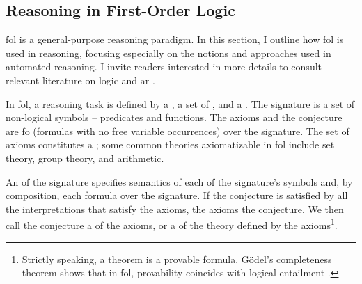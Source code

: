 \subsection{Reasoning in First-Order Logic}


\Gls{fol} is a general-purpose reasoning paradigm.
In this section, I outline how \gls{fol} is used in reasoning,
focusing especially on the notions and approaches used in automated reasoning.
I invite readers interested in more details to consult relevant literature on \gls{logic} \cite{DBLP:books/daglib/0072413,DBLP:books/daglib/0082098} and \gls{ar} \cite{DBLP:books/daglib/0022394,DBLP:books/el/RobinsonV01}.

In \gls{fol}, a reasoning task is defined by a , a set of , and a .
The signature is a set of non-logical symbols -- predicates and functions.
The axioms and the conjecture are \gls{fo}  (formulas with no free variable occurrences) over the signature.
The set of axioms constitutes a ;
some common theories axiomatizable in \gls{fol} include set theory, group theory, and arithmetic.

An  of the signature specifies semantics of each of the signature's symbols and, by composition, each formula over the signature.
If the conjecture is satisfied by all the interpretations that satisfy the axioms,
the axioms  the conjecture.
We then call the conjecture
a  of the axioms,
or a  of the theory defined by the axioms\footnote{Strictly speaking, a theorem is a provable formula.
Gödel's completeness theorem shows that in \gls{fol},
provability coincides with logical entailment \cite{DBLP:books/daglib/0072413}.}.

